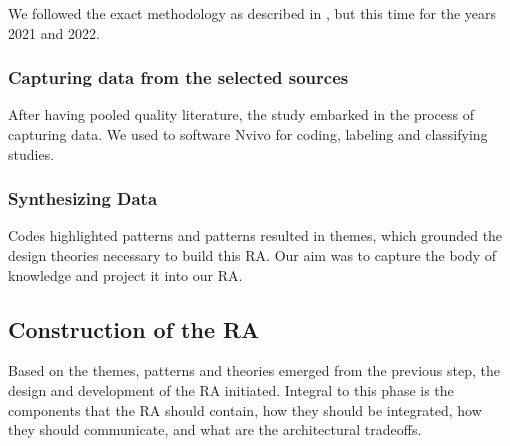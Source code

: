 \documentclass[runningheads]{llncs}
\begin{document}
We followed the exact methodology as described in \cite{AtaeiACIS}, but this time for the years 2021 and 2022. 




\subsubsection{Capturing data from the selected sources\\}
After having pooled quality literature, the study embarked in the process of capturing data. We used to software Nvivo for coding, labeling and classifying studies. 

\subsubsection*{Synthesizing Data\\}
Codes highlighted patterns and patterns resulted in themes, which grounded the design theories necessary to build this RA. Our aim was to capture the body of knowledge and project it into our RA. 

\subsection{Construction of the RA}

Based on the themes, patterns and theories emerged from the previous step, the design and development of the RA initiated. Integral to this phase is the components that the RA should contain, how they should be integrated, how they should communicate, and what are the architectural tradeoffs. 
\end{document}
